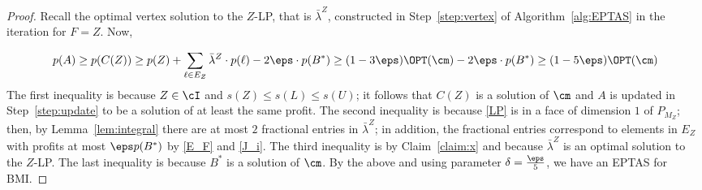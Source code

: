 \begin{proof}
	
	
	Recall the optimal vertex solution to the $Z$-LP, that is $\bar{\lambda}^Z$, constructed in Step~\ref{step:vertex} of Algorithm~\ref{alg:EPTAS} in the iteration for $F = Z$. Now, 
	
	
		\begin{equation*}
		\label{eq:p(x)}
		\begin{aligned}
			p(A) \geq p(C(Z)) \geq  p(Z)+\sum_{\ell \in E_Z} \bar{\lambda}^Z \cdot p(\ell) -2\eps \cdot p(B^*) \geq (1-3 \eps) \OPT(\cm) - 2\eps \cdot p(B^*) \geq  (1-5 \eps) \OPT(\cm)
		\end{aligned}
	\end{equation*} The first inequality is because $Z \in \cI$ and $s(Z) \leq s(L) \leq s(U)$; it follows that $C(Z)$ is a solution of $\cm$ and $A$ is updated in Step~\ref{step:update} to be a solution of at least the same profit. The second inequality is because \eqref{LP} is in a face of dimension $1$ of $P_{M_Z}$; then, by Lemma~\ref{lem:integral} there are at most $2$ fractional entries in $\bar{\lambda}^Z$; in addition, the fractional entries correspond to elements in $E_Z$ with profits at most $\eps p(B^*)$ by \eqref{E_F} and \eqref{J_i}. The third inequality is by Claim~\ref{claim:x} and because $\bar{\lambda}^Z$ is an optimal solution to the $Z$-LP. The last inequality is because $B^*$ is a solution of $\cm$. By the above and using parameter $\delta = \frac{\eps}{5}$, we have an EPTAS for BMI. 

\end{proof}



